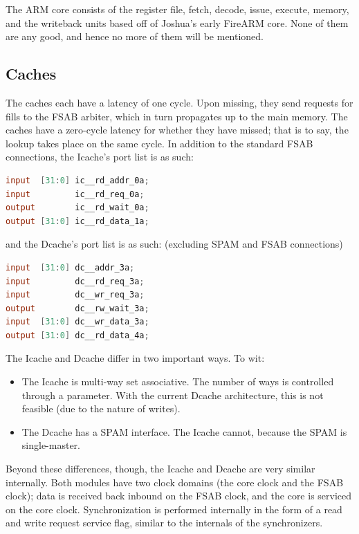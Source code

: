 \documentclass[10pt]{report}
\begin{document}
The ARM core consists of the register file, fetch, decode, issue, execute,
memory, and the writeback units based off of Joshua's early FireARM core.
None of them are any good, and hence no more of them will be mentioned.

\subsection{Caches}
The caches each have a latency of one cycle. Upon missing, they send
requests for fills to the FSAB arbiter, which in turn propagates up to the
main memory. The caches have a zero-cycle latency for whether they have
missed; that is to say, the lookup takes place on the same cycle. In
addition to the standard FSAB connections, the Icache's port list is as
such:

\begin{lstlisting}[basicstyle=\footnotesize,language=Verilog]
input  [31:0] ic__rd_addr_0a;
input         ic__rd_req_0a;
output        ic__rd_wait_0a;
output [31:0] ic__rd_data_1a;
\end{lstlisting}

and the Dcache's port list is as such: (excluding SPAM and FSAB connections)

\begin{lstlisting}[basicstyle=\footnotesize,language=Verilog]
input  [31:0] dc__addr_3a;
input         dc__rd_req_3a;
input         dc__wr_req_3a;
output        dc__rw_wait_3a;
input  [31:0] dc__wr_data_3a;
output [31:0] dc__rd_data_4a;
\end{lstlisting}

The Icache and Dcache differ in two important ways. To wit:

\begin{itemize}
\item{The Icache is multi-way set associative. The number of ways is
controlled through a parameter. With the current Dcache architecture, this
is not feasible (due to the nature of writes).}
\item{The Dcache has a SPAM interface. The Icache cannot, because the SPAM
is single-master.}
\end{itemize}

Beyond these differences, though, the Icache and Dcache are very similar
internally. Both modules have two clock domains (the core clock and the FSAB
clock); data is received back inbound on the FSAB clock, and the core is
serviced on the core clock. Synchronization is performed internally in the
form of a read and write request service flag, similar to the internals of
the synchronizers.
\end{document}
